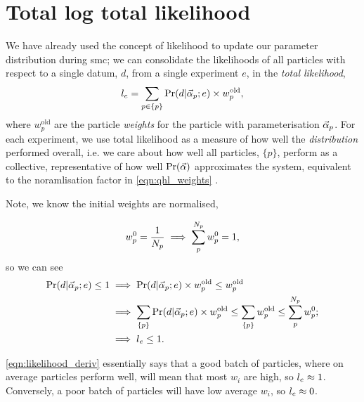 \section{Total log total likelihood}\label{sec:total_log_total_likelihood}
We have already used the concept of  \gls{likelihood} to update our parameter distribution during \gls{smc}; 
    we can consolidate the \glspl{likelihood}  of all \glspl{particle} with respect to a single datum, $d$, from a single \gls{experiment} $e$,  
    in the \emph{\gls{total likelihood}}, 
    \begin{equation}
        \label{eqn:total_likelihood}
        l_{e} = \sum\limits_{p \in \{p\}} \Pr(d | \vec{\alpha}_p ; e) \times w_p^{\textrm{old}},
    \end{equation}
    where $w_p^{\textrm{old}}$ are the \gls{particle} \emph{weights} for the \gls{particle} with parameterisation $\vec{\alpha}_p$.
For each experiment, we use \gls{total likelihood} as a measure of how well the \emph{distribution} performed overall,
    i.e. we care about how well all \glspl{particle}, $\{p\}$, perform as a collective, representative of how well $\Pr(\vec{\alpha})$ approximates the system,
    equivalent to the noramlisation factor in \cref{eqn:qhl_weights} \cite{granade2015characterizationp92}. 
\par 
Note, we know the initial weights are normalised,

\begin{equation}
    w_p^0 = \frac{1}{N_p}  \implies \sum_p^{N_p} w_p^0 = 1,
    \label{eqn:normalised_weights}
\end{equation}
    so we can see 
\begin{align}    
    \label{eqn:likelihood_deriv}
    \begin{split}
        \Pr(d | \vec{\alpha}_p; e) \leq 1 & \implies \Pr(d | \vec{\alpha}_p; e) \times w_p^{\textrm{old}} \leq w_p^{\textrm{old}} \\
        & \implies \sum\limits_{\{p\}} \Pr(d | \vec{\alpha}_p; e) \times w_p^{\textrm{old}} \leq \sum\limits_{\{p\}} w_p^{\textrm{old}} \leq \sum_p^{N_p} w_p^0; \\
        & \implies l_{e} \leq 1.
    \end{split}
\end{align}

\cref{eqn:likelihood_deriv} essentially says that a good batch of \glspl{particle}, 
    where on average \glspl{particle} perform well, 
    will mean that most $w_i$ are high, so $l_{e} \approx 1$. 
Conversely, a poor batch of \glspl{particle} will have low average $w_i$, so $l_{e} \approx 0$. 
\par

